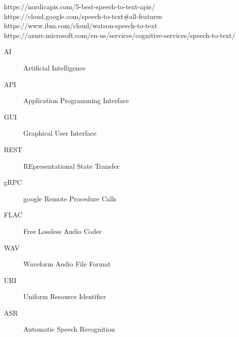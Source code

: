 \documentclass[oneside, 12pt]{book}
\begin{document}
%
\begin{Glossary}
https://nordicapis.com/5-best-speech-to-text-apis/
\newline
https://cloud.google.com/speech-to-text\#all-features
\newline
https://www.ibm.com/cloud/watson-speech-to-text
\newline
https://azure.microsoft.com/en-us/services/cognitive-services/speech-to-text/
\begin{description}
  \item[AI]Artificial Intelligence
  \item[API]Application Programming Interface
  \item[GUI]Graphical User Interface
  \item[REST]REpresentational State Transfer
  \item[gRPC]google Remote Procedure Calls
  \item[FLAC]Free Lossless Audio Codec
  \item[WAV]Waveform Audio File Format
  \item[URI]Uniform Resource Identifier
  \item[ASR]Automatic Speech Recognition
\end{description}
\end{Glossary}
\newpage
\printbibliography
\newpage
\lastpageinfo
\end{document}
